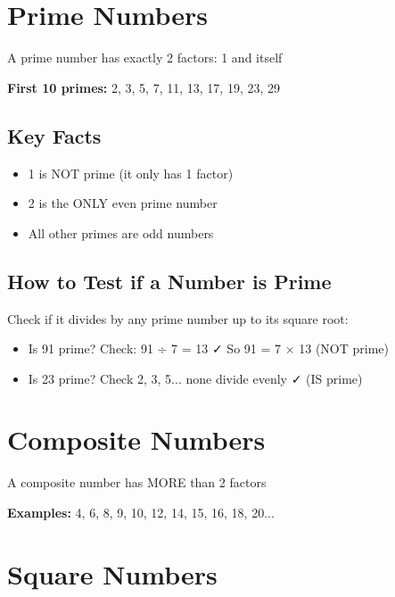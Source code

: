 \documentclass[a4paper,11pt]{article}
\begin{document}
\section{Prime Numbers}

\begin{tcolorbox}[colback=orange!5!white,colframe=orange!75!black,title=\textbf{What's a Prime?}]
A prime number has exactly 2 factors: 1 and itself
\end{tcolorbox}

\textbf{First 10 primes:} 2, 3, 5, 7, 11, 13, 17, 19, 23, 29

\subsection{Key Facts}
\begin{itemize}
    \item 1 is NOT prime (it only has 1 factor)
    \item 2 is the ONLY even prime number
    \item All other primes are odd numbers
\end{itemize}

\subsection{How to Test if a Number is Prime}
Check if it divides by any prime number up to its square root:
\begin{itemize}
    \item Is 91 prime? Check: 91 ÷ 7 = 13 ✓ So 91 = 7 × 13 (NOT prime)
    \item Is 23 prime? Check 2, 3, 5... none divide evenly ✓ (IS prime)
\end{itemize}

\section{Composite Numbers}

\begin{tcolorbox}[colback=red!5!white,colframe=red!75!black,title=\textbf{What's Composite?}]
A composite number has MORE than 2 factors
\end{tcolorbox}

\textbf{Examples:} 4, 6, 8, 9, 10, 12, 14, 15, 16, 18, 20...

\section{Square Numbers}
\end{document}
